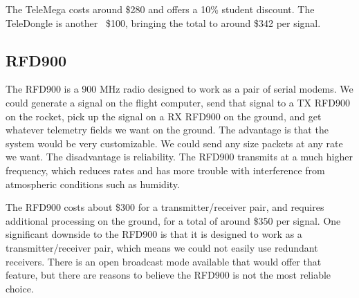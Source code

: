 \documentclass[onecolumn, draftclsnofoot, 10pt, compsoc]{IEEEtran}
\begin{document}
The TeleMega costs around \$280 and offers a 10\% student discount.  The TeleDongle is another ~\$100, bringing the total to around \$342 per signal.

\subsection{RFD900}
The RFD900 is a 900 MHz radio designed to work as a pair of serial modems.  We could generate a signal on the flight computer, send that signal to a TX RFD900 on the rocket, pick up the signal on a RX RFD900 on the ground, and get whatever telemetry fields we want on the ground.  The advantage is that the system would be very customizable.  We could send any size packets at any rate we want.  The disadvantage is reliability.  The RFD900 transmits at a much higher frequency, which reduces rates and has more trouble with interference from atmospheric conditions such as humidity.\cite{1}

The RFD900 costs about \$300 for a transmitter/receiver pair, and requires additional processing on the ground, for a total of around \$350 per signal.  One significant downside to the RFD900 is that it is designed to work as a transmitter/receiver pair, which means we could not easily use redundant receivers.  There is an open broadcast mode available that would offer that feature, but there are reasons to believe the RFD900 is not the most reliable choice.
\end{document}
